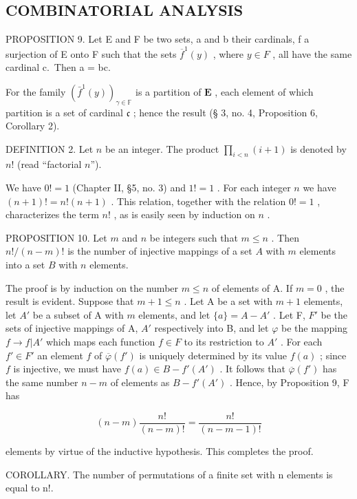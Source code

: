 \subsection{COMBINATORIAL ANALYSIS}

PROPOSITION 9. Let E and F be two sets, a and b their cardinals, f a surjection of E onto F such that the sets \(\overline{f}^{1}(y)\) , where \(y \in F\) , all have the same cardinal c.~Then a = bc.

For the family \((\bar{f}^1 (y))_{\gamma \in \mathbb{F}}\) is a partition of \(\mathbf{E}\) , each element of which partition is a set of cardinal \(\mathfrak{c}\) ; hence the result (§ 3, no. 4, Proposition 6, Corollary 2).

DEFINITION 2. Let \(n\) be an integer. The product \(\prod_{i < n} (i + 1)\) is denoted by \(n!\) (read ``factorial \(n\)'').

We have \(0! = 1\) (Chapter II, §5, no. 3) and \(1! = 1\) . For each integer \(n\) we have \((n + 1)! = n!(n + 1)\) . This relation, together with the relation \(0! = 1\) , characterizes the term \(n!\) , as is easily seen by induction on \(n\) .

PROPOSITION 10. Let \(m\) and \(n\) be integers such that \(m \leqslant n\) . Then \(n! / (n - m)!\) is the number of injective mappings of a set \(A\) with \(m\) elements into a set \(B\) with \(n\) elements.

The proof is by induction on the number \(m \leqslant n\) of elements of A. If \(m = 0\) , the result is evident. Suppose that \(m + 1 \leqslant n\) . Let A be a set with \(m + 1\) elements, let \(A'\) be a subset of A with \(m\) elements, and let \(\{a\} = A - A'\) . Let F, \(F'\) be the sets of injective mappings of A, \(A'\) respectively into B, and let \(\varphi\) be the mapping \(f \to f|A'\) which maps each function \(f \in F\) to its restriction to \(A'\) . For each \(f' \in F'\) an element \(f\) of \(\overline{\varphi}(f')\) is uniquely determined by its value \(f(a)\) ; since \(f\) is injective, we must have \(f(a) \in B - f'(A')\) . It follows that \(\overline{\varphi}(f')\) has the same number \(n - m\) of elements as \(B - f'(A')\) . Hence, by Proposition 9, F has

\[
(n - m) \frac {n !}{(n - m) !} = \frac {n !}{(n - m - 1) !}
\]

elements by virtue of the inductive hypothesis. This completes the proof.

COROLLARY. The number of permutations of a finite set with n elements is equal to n!.

